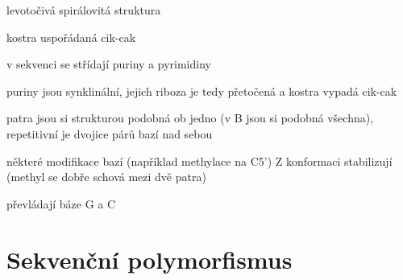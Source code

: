 \documentclass[DIV=8]{scrreprt}
\begin{document}
\begin{myItemize}[nosep]
    \item levotočivá spirálovitá struktura
    \item kostra uspořádaná cik-cak
\begin{myItemize}[nosep]
    \item v sekvenci se střídají puriny a pyrimidiny
\begin{myItemize}[nosep]
    \item puriny jsou synklinální, jejich riboza je tedy přetočená a kostra vypadá cik-cak
\end{myItemize}

\end{myItemize}

    \item patra jsou si strukturou podobná ob jedno (v B jsou si podobná všechna), repetitivní je dvojice párů bazí nad sebou
    \item některé modifikace bazí (například methylace na C5') Z konformaci stabilizují (methyl se dobře schová mezi dvě patra)
    \item převládají báze G a C
\end{myItemize}



\section{Sekvenční polymorfismus} \label{Sekvenční polymorfismus} \FloatBarrier
\end{document}

